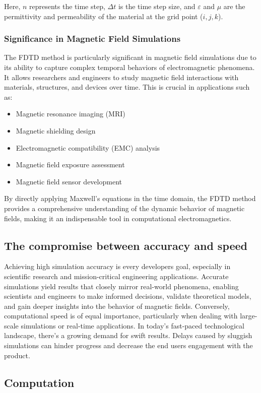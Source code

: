 \documentclass[11pt, a4paper, titlepage]{article}
\begin{document}
 
Here, \(n\) represents the time step, \(\Delta t\) is the time step size, and \(\varepsilon\) and \(\mu\) are the permittivity and permeability of the material at the grid point (\(i, j, k\)).
\newpage
\subsubsection{Significance in Magnetic Field Simulations}
The FDTD method is particularly significant in magnetic field simulations due to its ability to capture complex temporal behaviors of electromagnetic phenomena. It allows researchers and engineers to study magnetic field interactions with materials, structures, and devices over time. This is crucial in applications such as:
\begin{itemize}
	\item Magnetic resonance imaging (MRI)
	\item Magnetic shielding design
	\item Electromagnetic compatibility (EMC) analysis
	\item Magnetic field exposure assessment
	\item Magnetic field sensor development
\end{itemize}
By directly applying Maxwell's equations in the time domain, the FDTD method provides a comprehensive understanding of the dynamic behavior of magnetic fields, making it an indispensable tool in computational electromagnetics. 
\subsection{The compromise between accuracy and speed}
Achieving high simulation accuracy is every developers goal, especially in scientific research and mission-critical engineering applications. Accurate simulations yield results that closely mirror real-world phenomena, enabling scientists and engineers to make informed decisions, validate theoretical models, and gain deeper insights into the behavior of magnetic fields. 
Conversely, computational speed is of equal importance, particularly when dealing with large-scale simulations or real-time applications. In today's fast-paced technological landscape, there's a growing demand for swift results. Delays caused by sluggish simulations can hinder progress and decrease the end users engagement with the product. 

\newpage

\subsection{Computation}
\end{document}
